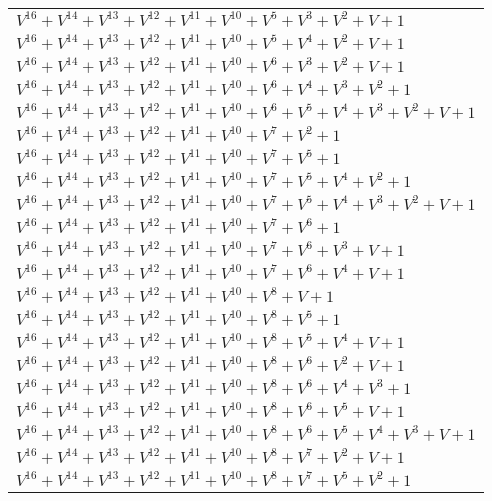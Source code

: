 \documentclass[12pt]{article}
\begin{document}
\begin{adjustwidth}{-4cm}{}
\begin{center}
\begin{longtable}{|l|}
$V^{16}  +V^{14}  +V^{13}  +V^{12}  +V^{11}  +V^{10}  +V^{5}  +V^{3}  +V^{2}  + V + 1$ \\
$V^{16}  +V^{14}  +V^{13}  +V^{12}  +V^{11}  +V^{10}  +V^{5}  +V^{4}  +V^{2}  + V + 1$ \\
$V^{16}  +V^{14}  +V^{13}  +V^{12}  +V^{11}  +V^{10}  +V^{6}  +V^{3}  +V^{2}  + V + 1$ \\
$V^{16}  +V^{14}  +V^{13}  +V^{12}  +V^{11}  +V^{10}  +V^{6}  +V^{4}  +V^{3}  +V^{2}  + 1$ \\
$V^{16}  +V^{14}  +V^{13}  +V^{12}  +V^{11}  +V^{10}  +V^{6}  +V^{5}  +V^{4}  +V^{3}  +V^{2}  + V + 1$ \\
$V^{16}  +V^{14}  +V^{13}  +V^{12}  +V^{11}  +V^{10}  +V^{7}  +V^{2}  + 1$ \\
$V^{16}  +V^{14}  +V^{13}  +V^{12}  +V^{11}  +V^{10}  +V^{7}  +V^{5}  + 1$ \\
$V^{16}  +V^{14}  +V^{13}  +V^{12}  +V^{11}  +V^{10}  +V^{7}  +V^{5}  +V^{4}  +V^{2}  + 1$ \\
$V^{16}  +V^{14}  +V^{13}  +V^{12}  +V^{11}  +V^{10}  +V^{7}  +V^{5}  +V^{4}  +V^{3}  +V^{2}  + V + 1$ \\
$V^{16}  +V^{14}  +V^{13}  +V^{12}  +V^{11}  +V^{10}  +V^{7}  +V^{6}  + 1$ \\
$V^{16}  +V^{14}  +V^{13}  +V^{12}  +V^{11}  +V^{10}  +V^{7}  +V^{6}  +V^{3}  + V + 1$ \\
$V^{16}  +V^{14}  +V^{13}  +V^{12}  +V^{11}  +V^{10}  +V^{7}  +V^{6}  +V^{4}  + V + 1$ \\
$V^{16}  +V^{14}  +V^{13}  +V^{12}  +V^{11}  +V^{10}  +V^{8}  + V + 1$ \\
$V^{16}  +V^{14}  +V^{13}  +V^{12}  +V^{11}  +V^{10}  +V^{8}  +V^{5}  + 1$ \\
$V^{16}  +V^{14}  +V^{13}  +V^{12}  +V^{11}  +V^{10}  +V^{8}  +V^{5}  +V^{4}  + V + 1$ \\
$V^{16}  +V^{14}  +V^{13}  +V^{12}  +V^{11}  +V^{10}  +V^{8}  +V^{6}  +V^{2}  + V + 1$ \\
$V^{16}  +V^{14}  +V^{13}  +V^{12}  +V^{11}  +V^{10}  +V^{8}  +V^{6}  +V^{4}  +V^{3}  + 1$ \\
$V^{16}  +V^{14}  +V^{13}  +V^{12}  +V^{11}  +V^{10}  +V^{8}  +V^{6}  +V^{5}  + V + 1$ \\
$V^{16}  +V^{14}  +V^{13}  +V^{12}  +V^{11}  +V^{10}  +V^{8}  +V^{6}  +V^{5}  +V^{4}  +V^{3}  + V + 1$ \\
$V^{16}  +V^{14}  +V^{13}  +V^{12}  +V^{11}  +V^{10}  +V^{8}  +V^{7}  +V^{2}  + V + 1$ \\
$V^{16}  +V^{14}  +V^{13}  +V^{12}  +V^{11}  +V^{10}  +V^{8}  +V^{7}  +V^{5}  +V^{2}  + 1$ \\

\end{longtable}
\end{center}
\end{adjustwidth}
\end{document}
